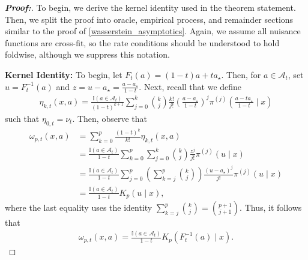 \documentclass[10pt,a4paper]{amsart}
\begin{document}
\begin{proof}[\textbf{Proof:}] 
     To begin, we derive the kernel identity used in the theorem statement. Then, we split the proof into oracle, empirical process, and remainder sections similar to the proof of \cref{wasserstein_asymptotics}. Again, we assume all nuisance functions are cross-fit, so the rate conditions should be understood to hold foldwise, although we suppress this notation. \medskip

     \textbf{Kernel Identity:} To begin, let $F_t(a) = (1 - t)a + t a_\star$. Then, for $a \in \mathcal{A}_t$, set $u=F_t^{-1}(a)$ and $z=u-a_\star=\frac{a-a_\star}{1-t}$. Next, recall that we define
     \begin{align*}
           \eta_{k,t}(x,a) = \frac{\mathbb{I}(a\in\mathcal{A}_t)}{(1-t)^{k+1}} \sum_{j=0}^{k} \binom{k}{j} \frac{k!}{j!} \left( \frac{a-a_\star}{1-t}\right)^j \pi^{(j)}\left(\frac{a-ta_\star}{1-t}\mid x\right)
     \end{align*}
     such that $\eta_{0, t} = \nu_t$. Then, observe that
     \begin{align*}
     \omega_{p,t}(x,a) &= \sum_{k=0}^{p}\frac{(1-t)^k}{k!}\eta_{k,t}(x,a)\\ 
     &= \frac{\mathbb{I}(a\in\mathcal{A}_t)}{1-t} \sum_{k=0}^{p}\sum_{j=0}^{k} \binom{k}{j}\frac{z^j}{j!}\pi^{(j)}(u\mid x)\\
     &= \frac{\mathbb{I}(a\in\mathcal{A}_t)}{1-t} \sum_{j=0}^{p} \left(\sum_{k=j}^{p}\binom{k}{j}\right) \frac{(u-a_\star)^j}{j!}\pi^{(j)}(u\mid x)\\
     &= \frac{\mathbb{I}(a\in\mathcal{A}_t)}{1-t}K_p(u\mid x),
\end{align*}
where the last equality uses the identity $ \sum_{k=j}^{p}\binom{k}{j} = \binom{p+1}{j+1}$. 
Thus, it follows that
\begin{align} \label{omega_kernel_def}
    \omega_{p,t}(x,a) = \frac{\mathbb{I}(a\in\mathcal{A}_t)}{1-t} K_p\!\left(F_t^{-1}(a)\mid x\right).
\end{align}


\end{proof}
\end{document}
